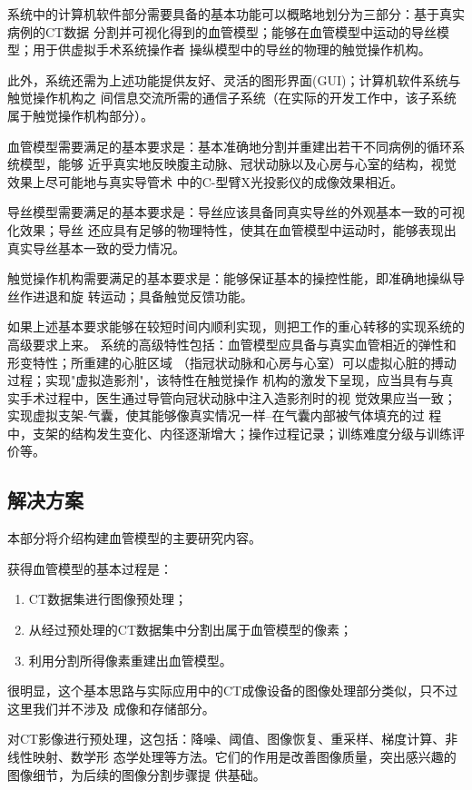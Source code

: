 系统中的计算机软件部分需要具备的基本功能可以概略地划分为三部分：基于真实病例的CT数据
分割并可视化得到的血管模型；能够在血管模型中运动的导丝模型；用于供虚拟手术系统操作者
操纵模型中的导丝的物理的触觉操作机构。

此外，系统还需为上述功能提供友好、灵活的图形界面(GUI)；计算机软件系统与触觉操作机构之
间信息交流所需的通信子系统（在实际的开发工作中，该子系统属于触觉操作机构部分）。

血管模型需要满足的基本要求是：基本准确地分割并重建出若干不同病例的循环系统模型，能够
近乎真实地反映腹主动脉、冠状动脉以及心房与心室的结构，视觉效果上尽可能地与真实导管术
中的C-型臂X光投影仪的成像效果相近。

导丝模型需要满足的基本要求是：导丝应该具备同真实导丝的外观基本一致的可视化效果；导丝
还应具有足够的物理特性，使其在血管模型中运动时，能够表现出真实导丝基本一致的受力情况。

触觉操作机构需要满足的基本要求是：能够保证基本的操控性能，即准确地操纵导丝作进退和旋
转运动；具备触觉反馈功能。

如果上述基本要求能够在较短时间内顺利实现，则把工作的重心转移的实现系统的高级要求上来。
系统的高级特性包括：血管模型应具备与真实血管相近的弹性和形变特性；所重建的心脏区域
（指冠状动脉和心房与心室）可以虚拟心脏的搏动过程；实现"虚拟造影剂"，该特性在触觉操作
机构的激发下呈现，应当具有与真实手术过程中，医生通过导管向冠状动脉中注入造影剂时的视
觉效果应当一致；实现虚拟支架-气囊，使其能够像真实情况一样--在气囊内部被气体填充的过
程中，支架的结构发生变化、内径逐渐增大；操作过程记录；训练难度分级与训练评价等。

\subsection{解决方案}
\label{subsec1-1-3}

本部分将介绍构建血管模型的主要研究内容。

获得血管模型的基本过程是：
\begin{enumerate}
  \item CT数据集进行图像预处理；
  \item 从经过预处理的CT数据集中分割出属于血管模型的像素；
  \item 利用分割所得像素重建出血管模型。
\end{enumerate}
很明显，这个基本思路与实际应用中的CT成像设备的图像处理部分类似，只不过这里我们并不涉及
成像和存储部分。

对CT影像进行预处理，这包括：降噪、阈值、图像恢复、重采样、梯度计算、非线性映射、数学形
态学处理等方法。它们的作用是改善图像质量，突出感兴趣的图像细节，为后续的图像分割步骤提
供基础。


